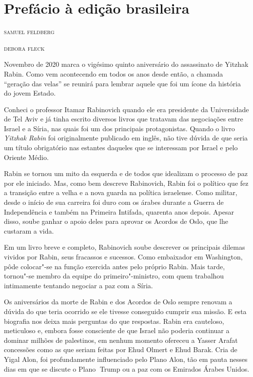 \chapter{Prefácio à edição brasileira}

\begin{flushright}
\textsc{samuel feldberg}

\textsc{debora fleck}
\end{flushright}


\noindent{}Novembro de 2020 marca o vigésimo quinto aniversário do assassinato de
Yitzhak Rabin. Como vem acontecendo em todos os anos desde então, a
chamada ``geração das velas'' se reunirá para lembrar aquele que foi um
ícone da história do jovem Estado.

Conheci o professor Itamar Rabinovich quando ele era presidente da
Universidade de Tel Aviv e já tinha escrito diversos livros que tratavam
das negociações entre Israel e a Síria, nas quais foi um dos principais
protagonistas. Quando o livro \emph{Yitzhak Rabin} foi originalmente publicado 
em inglês, não tive dúvida de que
seria um título obrigatório nas estantes daqueles que se interessam por
Israel e pelo Oriente Médio.

Rabin se tornou um mito da esquerda e de todos que idealizam o processo
de paz por ele iniciado. Mas, como bem descreve Rabinovich, Rabin foi o
político que fez a transição entre a velha e a nova guarda na política
israelense. Como militar, desde o início de sua carreira foi duro com os
árabes durante a Guerra de Independência e também na Primeira Intifada,
quarenta anos depois. Apesar disso, soube ganhar o apoio deles para
aprovar os Acordos de Oslo, que lhe custaram a vida.

Em um livro breve e completo, Rabinovich soube descrever os principais
dilemas vividos por Rabin, seus fracassos e sucessos. Como embaixador em
Washington, pôde colocar"-se na função exercida antes pelo próprio Rabin.
Mais tarde, tornou"-se membro da equipe do
primeiro"-ministro, com quem trabalhou intimamente tentando negociar a paz
com a Síria.

Os aniversários da morte de Rabin e dos Acordos de Oslo sempre renovam a
dúvida do que teria ocorrido se ele tivesse conseguido cumprir sua
missão. E esta biografia nos deixa mais perguntas do que respostas.
Rabin era cauteloso, meticuloso e, embora fosse consciente de que Israel não poderia continuar a dominar milhões de palestinos, em nenhum momento ofereceu a Yasser Arafat concessões como as que seriam feitas por Ehud Olmert e Ehud Barak. Cria de Yigal Alon, foi profundamente influenciado pelo Plano Alon, tão em pauta nesses dias em que se discute o Plano 􏰃Trump ou a paz com os Emirados Árabes Unidos.

